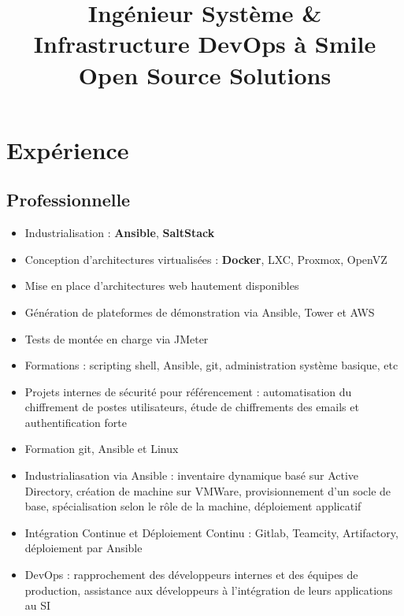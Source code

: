 \documentclass[10pt,a4paper]{moderncv}
\title{Ingénieur Système \& Infrastructure\newline
DevOps à Smile Open Source Solutions}
\begin{document}
\makecvtitle

\section{Expérience}

\subsection{Professionnelle}

{
  \begin{itemize}
    \item Industrialisation : \textbf{Ansible}, \textbf{SaltStack}
    \item Conception d'architectures virtualisées : \textbf{Docker}, LXC,
      Proxmox, OpenVZ
    \item Mise en place d'architectures web hautement disponibles
    \item Génération de plateformes de démonstration via Ansible, Tower et AWS
    \item Tests de montée en charge via JMeter
    \item Formations : scripting shell, Ansible, git, administration système
      basique, etc
    \item Projets internes de sécurité pour référencement : automatisation du
      chiffrement de postes utilisateurs, étude de chiffrements des emails et
      authentification forte
  \end{itemize}
}

{
  \begin{itemize}
    \item Formation git, Ansible et Linux
    \item Industrialiasation via Ansible : inventaire dynamique basé sur Active
      Directory, création de machine sur VMWare, provisionnement d'un socle de
      base, spécialisation selon le rôle de la machine, déploiement applicatif
    \item Intégration Continue et Déploiement Continu : Gitlab, Teamcity,
      Artifactory, déploiement par Ansible
    \item DevOps : rapprochement des développeurs internes et des équipes de
      production, assistance aux développeurs à l'intégration de leurs
      applications au SI
  \end{itemize}
}
\end{document}
